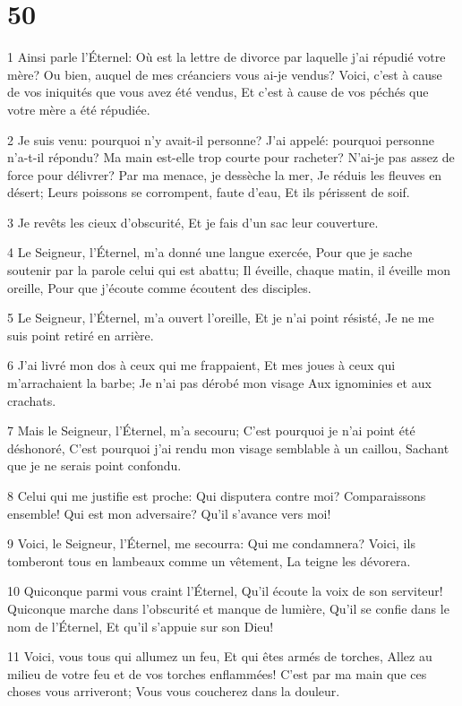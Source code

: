 \chapter{50}

\par 1 Ainsi parle l'Éternel: Où est la lettre de divorce par laquelle j'ai répudié votre mère? Ou bien, auquel de mes créanciers vous ai-je vendus? Voici, c'est à cause de vos iniquités que vous avez été vendus, Et c'est à cause de vos péchés que votre mère a été répudiée.
\par 2 Je suis venu: pourquoi n'y avait-il personne? J'ai appelé: pourquoi personne n'a-t-il répondu? Ma main est-elle trop courte pour racheter? N'ai-je pas assez de force pour délivrer? Par ma menace, je dessèche la mer, Je réduis les fleuves en désert; Leurs poissons se corrompent, faute d'eau, Et ils périssent de soif.
\par 3 Je revêts les cieux d'obscurité, Et je fais d'un sac leur couverture.
\par 4 Le Seigneur, l'Éternel, m'a donné une langue exercée, Pour que je sache soutenir par la parole celui qui est abattu; Il éveille, chaque matin, il éveille mon oreille, Pour que j'écoute comme écoutent des disciples.
\par 5 Le Seigneur, l'Éternel, m'a ouvert l'oreille, Et je n'ai point résisté, Je ne me suis point retiré en arrière.
\par 6 J'ai livré mon dos à ceux qui me frappaient, Et mes joues à ceux qui m'arrachaient la barbe; Je n'ai pas dérobé mon visage Aux ignominies et aux crachats.
\par 7 Mais le Seigneur, l'Éternel, m'a secouru; C'est pourquoi je n'ai point été déshonoré, C'est pourquoi j'ai rendu mon visage semblable à un caillou, Sachant que je ne serais point confondu.
\par 8 Celui qui me justifie est proche: Qui disputera contre moi? Comparaissons ensemble! Qui est mon adversaire? Qu'il s'avance vers moi!
\par 9 Voici, le Seigneur, l'Éternel, me secourra: Qui me condamnera? Voici, ils tomberont tous en lambeaux comme un vêtement, La teigne les dévorera.
\par 10 Quiconque parmi vous craint l'Éternel, Qu'il écoute la voix de son serviteur! Quiconque marche dans l'obscurité et manque de lumière, Qu'il se confie dans le nom de l'Éternel, Et qu'il s'appuie sur son Dieu!
\par 11 Voici, vous tous qui allumez un feu, Et qui êtes armés de torches, Allez au milieu de votre feu et de vos torches enflammées! C'est par ma main que ces choses vous arriveront; Vous vous coucherez dans la douleur.


